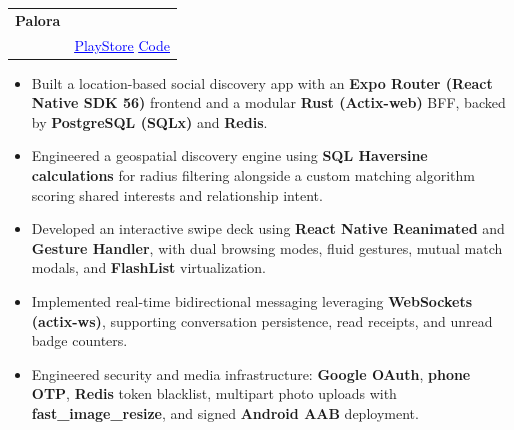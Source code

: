 \documentclass[a4paper,11pt]{article}
\makeatletter
\newcommand{\resumeProjectHeading}[4]{
\vspace{0.5mm}
    \item[]
    \begin{tabular*}{0.98\textwidth}[t]{l@{\extracolsep{\fill}}r}
        \textbf{#1} & \textit{\footnotesize{#2}} \\
        \textit{\footnotesize{#3}} & \footnotesize{#4}
    \end{tabular*}
    \vspace{-2.4mm}
}
\providecommand{\faGooglePlay}{\faExternalLink*}
\newcommand{\resumeProjectLinksPlayStore}[2]{
    \footnotesize{
        \href{#1}{\textcolor{blue}{\underline{\faGooglePlay{} PlayStore}}} \hspace{1mm}
        \href{#2}{\textcolor{blue}{\underline{\faCode{} Code}}}
    }
}
\newcommand{\resumeItemListStart}{\begin{justify}\begin{itemize}[leftmargin=3ex, rightmargin=2ex, noitemsep,labelsep=1.2mm,itemsep=0mm]\small}
\newcommand{\resumeItemListEnd}{\end{itemize}\end{justify}\vspace{-2mm}}
\makeatother
\begin{document}
    \resumeProjectHeading
        {Palora}{} 
    {\parbox[t]{0.7\linewidth}{A location-based social discovery and dating mobile platform featuring real-time matching, swipe mechanics, and instant messaging.}}{
        \resumeProjectLinksPlayStore{https://play.google.com/store/apps/details?id=com.kraftisium.palora}{https://github.com/itsarraj/palora}
        }
    \resumeItemListStart
        \item {Built a location-based social discovery app with an \textbf{Expo Router (React Native SDK 56)} frontend and a modular \textbf{Rust (Actix-web)} BFF, backed by \textbf{PostgreSQL (SQLx)} and \textbf{Redis}.}
        \item {Engineered a geospatial discovery engine using \textbf{SQL Haversine calculations} for radius filtering alongside a custom matching algorithm scoring shared interests and relationship intent.}
        \item {Developed an interactive swipe deck using \textbf{React Native Reanimated} and \textbf{Gesture Handler}, with dual browsing modes, fluid gestures, mutual match modals, and \textbf{FlashList} virtualization.}
        \item {Implemented real-time bidirectional messaging leveraging \textbf{WebSockets (actix-ws)}, supporting conversation persistence, read receipts, and unread badge counters.}
        \item {Engineered security and media infrastructure: \textbf{Google OAuth}, \textbf{phone OTP}, \textbf{Redis} token blacklist, multipart photo uploads with \textbf{fast\_image\_resize}, and signed \textbf{Android AAB} deployment.}
    \resumeItemListEnd
    \vspace{-2mm}
\end{document}
